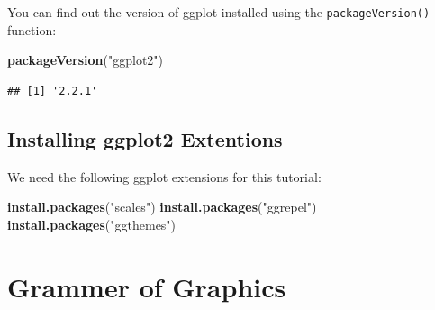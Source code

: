\documentclass[]{article}
\newenvironment{Shaded}{\begin{snugshade}}{\end{snugshade}}
\newcommand{\KeywordTok}[1]{\textcolor[rgb]{0.13,0.29,0.53}{\textbf{{#1}}}}
\newcommand{\StringTok}[1]{\textcolor[rgb]{0.31,0.60,0.02}{{#1}}}
\newcommand{\NormalTok}[1]{{#1}}
\theoremstyle{definition}
\theoremstyle{definition}
\theoremstyle{definition}
\theoremstyle{remark}
\begin{document}
You can find out the version of ggplot installed using the
\texttt{packageVersion()} function:

\begin{Shaded}
\begin{Highlighting}[]
\KeywordTok{packageVersion}\NormalTok{(}\StringTok{"ggplot2"}\NormalTok{)}
\end{Highlighting}
\end{Shaded}

\begin{verbatim}
## [1] '2.2.1'
\end{verbatim}

\subsection{Installing ggplot2
Extentions}\label{installing-ggplot2-extentions}

We need the following ggplot extensions for this tutorial:

\begin{Shaded}
\begin{Highlighting}[]
\KeywordTok{install.packages}\NormalTok{(}\StringTok{"scales"}\NormalTok{)}
\KeywordTok{install.packages}\NormalTok{(}\StringTok{"ggrepel"}\NormalTok{)}
\KeywordTok{install.packages}\NormalTok{(}\StringTok{"ggthemes"}\NormalTok{)}
\end{Highlighting}
\end{Shaded}

\section{Grammer of Graphics}\label{grammer-of-graphics}
\end{document}
